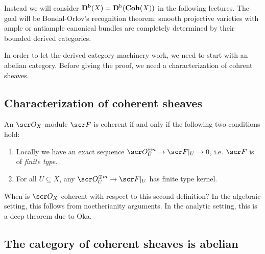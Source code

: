\documentclass[A4paper, british]{amsart}
\theoremstyle{darkgreentheorem}
\theoremstyle{darkbluedefinition}
\theoremstyle{darkredexample}
\theoremstyle{remark}
\newcommand{\1}{\mathbbm{1}}
\newcommand{\op}{\oplus}
\newcommand{\sub}{\subseteq}
\begin{document}
Instead we will consider $\mathbf{D}^{\mathrm{b}}(X)=\mathbf{D}^{\mathrm{b}}(\mathbf{Coh}(X))$ in the following lectures.
The goal will be Bondal-Orlov's recognition theorem: smooth projective varieties with ample or antiample canonical bundles are completely determined by their bounded derived categories.

In order to let the derived category machinery work, we need to start with an abelian category.
Before giving the proof, we need a characterization of cohrent sheaves.

\subsection{Characterization of coherent sheaves}

An $\O_{X}$-module $\F$ is coherent if and only if the following two conditions hold:
\begin{enumerate}
    \item Locally we have an exact sequence $\O_{U}^{\op n}\to \F|_{U}\to 0$, i.e. $\F$ is of \textit{finite type}.
    \item For all $U\sub X$, any $\O_{U}^{\op m}\to \F|_{U}$ has finite type kernel.
\end{enumerate}

When is $\O_{X}$ coherent with respect to this second definition?
In the algebraic setting, this follows from noetherianity arguments.
In the analytic setting, this is a deep theorem due to Oka.
	    
\subsection{The category of coherent sheaves is abelian}
\end{document}
